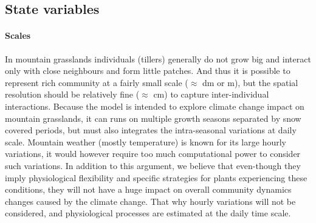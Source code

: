 \subsection{State variables}

\paragraph{Scales}
In mountain grasslands individuals (tillers) generally do not grow big and interact only with close neighbours and form little patches. And thus it is possible to represent rich community at a fairly small scale ($\approx$ dm or m), but the spatial resolution should be relatively fine ($\approx$ cm) to capture inter-individual interactions. Because the model is intended to explore climate change impact on mountain grasslands, it can runs on multiple growth seasons separated by snow covered periods, but must also integrates the intra-seasonal variations at daily scale. Mountain weather (mostly temperature) is known for its large hourly variations, it would however require too much computational power to consider such variations. In addition  to this argument, we believe that even-though  they imply physiological flexibility and specific strategies for plants experiencing these conditions, they will not have a huge impact on overall community dynamics changes caused by the climate change. That why hourly variations will not be considered, and physiological processes are estimated at the daily time scale.

